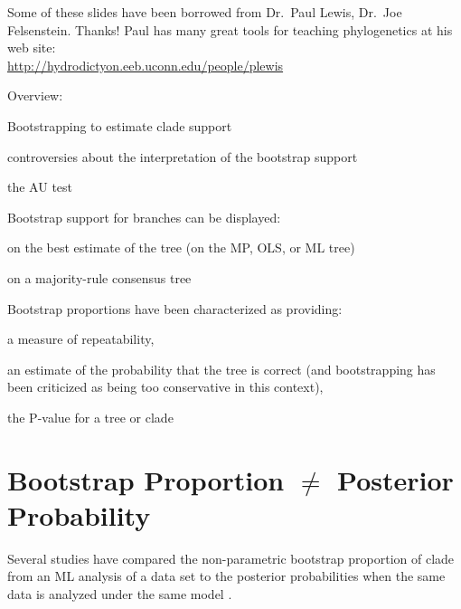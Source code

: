 \documentclass[landscape]{foils}
\begin{document}
\pagecolor{white}
\unitlength=1mm
\begin{center}
{\Large Some of these slides have been borrowed from Dr.\ Paul Lewis, Dr.\ Joe Felsenstein. Thanks!}
\vskip 15mm
\large Paul has many great tools for teaching phylogenetics at his web site: \\
\url{http://hydrodictyon.eeb.uconn.edu/people/plewis}
\end{center}

\myNewSlide
\Large
Overview:
\begin{compactitem}
	\item Bootstrapping to estimate clade support
	\item controversies about the interpretation of the bootstrap support
	\item the AU test
\end{compactitem}

\myNewSlide
 

\myNewSlide
 

\myNewSlide
Bootstrap support for branches can be displayed:
\begin{compactitem}
	\item on the best estimate of the tree (on the MP, OLS, or ML tree)
	\item on a majority-rule consensus tree \citep[see][]{BerryG1996}
\end{compactitem}


\myNewSlide
\large
Bootstrap proportions have been characterized as providing:
\begin{compactitem}
	\item a measure of repeatability,
	\item an estimate of the probability that the tree is correct (and bootstrapping has been criticized as being too conservative in this context),
	\item the P-value for a tree or clade
\end{compactitem}





\myNewSlide
\section*{Bootstrap Proportion $\neq$ Posterior Probability}
Several studies have compared the non-parametric bootstrap proportion of clade from an ML analysis of a data set to the posterior probabilities when the same data is analyzed under the same model \citep{SuzukiGN2002,WilcoxZHH2002,AlfaroZL2003,CummingsHMRRW2003,DouadyDBDD2003}.\par
\end{document}
